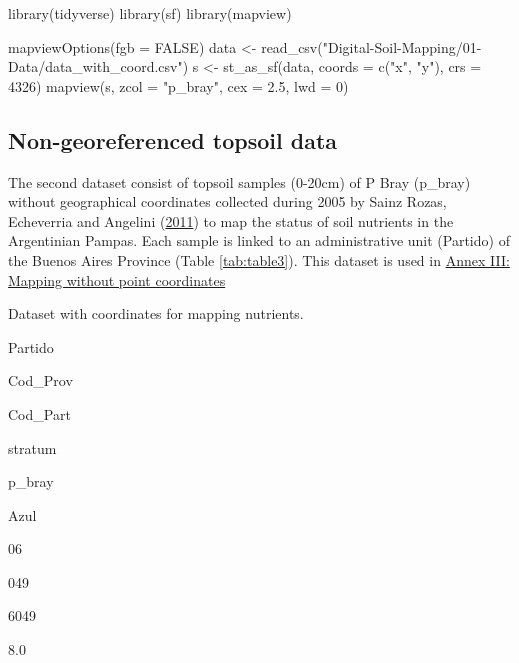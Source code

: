 \documentclass[
  10pt,
  b5paper,
  oneside]{book}
\newenvironment{Shaded}{\begin{snugshade}}{\end{snugshade}}
\newcommand{\AttributeTok}[1]{\textcolor[rgb]{0.77,0.63,0.00}{#1}}
\newcommand{\ConstantTok}[1]{\textcolor[rgb]{0.00,0.00,0.00}{#1}}
\newcommand{\DecValTok}[1]{\textcolor[rgb]{0.00,0.00,0.81}{#1}}
\newcommand{\FloatTok}[1]{\textcolor[rgb]{0.00,0.00,0.81}{#1}}
\newcommand{\FunctionTok}[1]{\textcolor[rgb]{0.00,0.00,0.00}{#1}}
\newcommand{\NormalTok}[1]{#1}
\newcommand{\OtherTok}[1]{\textcolor[rgb]{0.56,0.35,0.01}{#1}}
\newcommand{\StringTok}[1]{\textcolor[rgb]{0.31,0.60,0.02}{#1}}
\begin{document}
\begin{Shaded}
\begin{Highlighting}[]
\FunctionTok{library}\NormalTok{(tidyverse)}
\FunctionTok{library}\NormalTok{(sf)}
\FunctionTok{library}\NormalTok{(mapview)}

\FunctionTok{mapviewOptions}\NormalTok{(}\AttributeTok{fgb =} \ConstantTok{FALSE}\NormalTok{)}
\NormalTok{data }\OtherTok{\textless{}{-}} \FunctionTok{read\_csv}\NormalTok{(}\StringTok{"Digital{-}Soil{-}Mapping/01{-}Data/data\_with\_coord.csv"}\NormalTok{)}
\NormalTok{s }\OtherTok{\textless{}{-}} \FunctionTok{st\_as\_sf}\NormalTok{(data, }\AttributeTok{coords =} \FunctionTok{c}\NormalTok{(}\StringTok{"x"}\NormalTok{, }\StringTok{"y"}\NormalTok{), }\AttributeTok{crs =} \DecValTok{4326}\NormalTok{)}
\FunctionTok{mapview}\NormalTok{(s, }\AttributeTok{zcol =} \StringTok{"p\_bray"}\NormalTok{, }\AttributeTok{cex =} \FloatTok{2.5}\NormalTok{, }\AttributeTok{lwd =} \DecValTok{0}\NormalTok{)}
\end{Highlighting}
\end{Shaded}

\hypertarget{non-georeferenced-topsoil-data}{%
\subsection{Non-georeferenced topsoil data}\label{non-georeferenced-topsoil-data}}

The second dataset consist of topsoil samples (0-20cm) of P Bray (p\_bray) without geographical coordinates collected during 2005 by Sainz Rozas, Echeverria and Angelini (\protect\hyperlink{ref-sainz2011}{2011}) to map the status of soil nutrients in the Argentinian Pampas. Each sample is linked to an administrative unit (Partido) of the Buenos Aires Province (Table \ref{tab:table3}). This dataset is used in \href{https://fao-gsp.github.io/GSNmap-TM/annex-ii-mapping-without-point-coordinates.html}{Annex III: Mapping without point coordinates}

\label{tab:table3}Dataset with coordinates for mapping nutrients.

Partido

Cod\_Prov

Cod\_Part

stratum

p\_bray

Azul

06

049

6049

8.0
\end{document}
